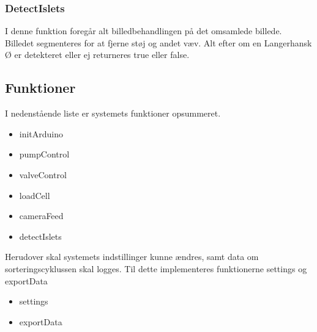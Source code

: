 \subsubsection{DetectIslets}
I denne funktion foregår alt billedbehandlingen på det omsamlede billede. Billedet segmenteres for at fjerne støj og andet væv. Alt efter om en Langerhansk Ø er detekteret eller ej returneres true eller false. 

\newpage
\subsection{Funktioner}
I nedenstående liste er systemets funktioner opsummeret. 
\begin{itemize}
\item initArduino
\item pumpControl 
\item valveControl 
\item loadCell 
\item cameraFeed 
\item detectIslets 
\end{itemize}
Herudover skal systemets indstillinger kunne ændres, samt data om sorteringscyklussen skal logges. Til dette implementeres funktionerne settings og exportData 
\begin{itemize}
\item settings 
\item exportData 
\end{itemize}

\newpage







